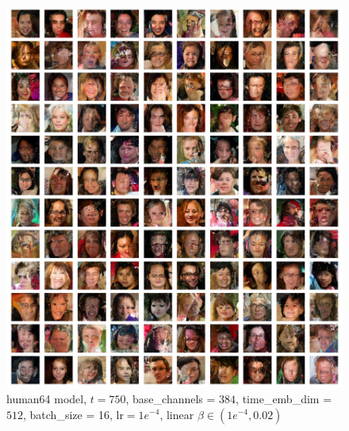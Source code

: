 \documentclass[12pt]{article}
\begin{document}
\begin{figure}[H]
  \centering
  \includegraphics[width=1\textwidth]{human64ext.jpg}
  \caption{human64 model, $t=750$, base\_channels = $384$, time\_emb\_dim = $512$, batch\_size = 16, lr$=1e^{-4}$, linear $\beta \in(1e^{-4}, 0.02)$}
\end{figure}
\end{document}

